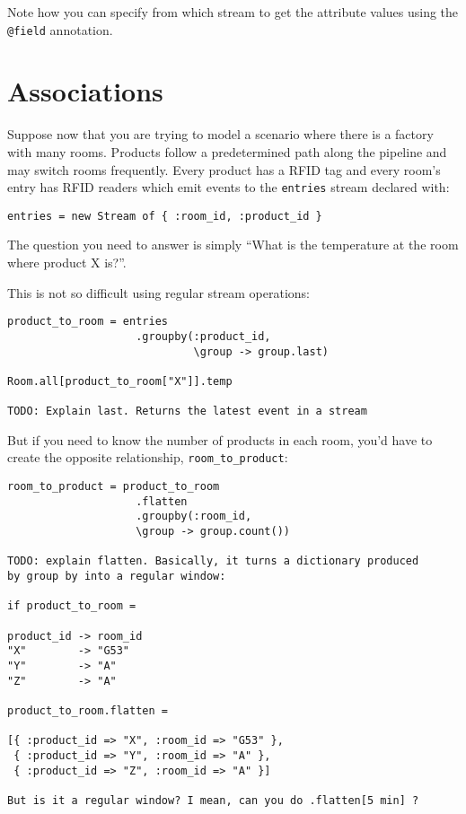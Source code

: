 \documentclass{report}
\begin{document}
Note how you can specify from which stream to get the attribute values
using the \verb=@field= annotation.

\section{Associations}
\label{sec:associations}

Suppose now that you are trying to model a scenario where there is a
factory with many rooms. Products follow a predetermined path along
the pipeline and may switch rooms frequently. Every product has a
RFID tag and every room's entry has RFID readers which emit events to
the \verb=entries= stream declared with:

\begin{verbatim}
entries = new Stream of { :room_id, :product_id }
\end{verbatim}

The question you need to answer is simply ``What is the temperature at
the room where product X is?''.

This is not so difficult using regular stream operations:

\begin{verbatim}
product_to_room = entries
                    .groupby(:product_id,
                             \group -> group.last)

Room.all[product_to_room["X"]].temp

TODO: Explain last. Returns the latest event in a stream
\end{verbatim}

But if you need to know the number of products in each room, you'd
have to create the opposite relationship, \verb=room_to_product=:

\begin{verbatim}
room_to_product = product_to_room
                    .flatten
                    .groupby(:room_id,
                    \group -> group.count())

TODO: explain flatten. Basically, it turns a dictionary produced
by group by into a regular window:

if product_to_room =

product_id -> room_id
"X"        -> "G53"
"Y"        -> "A"
"Z"        -> "A"

product_to_room.flatten =

[{ :product_id => "X", :room_id => "G53" },
 { :product_id => "Y", :room_id => "A" },
 { :product_id => "Z", :room_id => "A" }]

But is it a regular window? I mean, can you do .flatten[5 min] ?

\end{verbatim}
\end{document}
